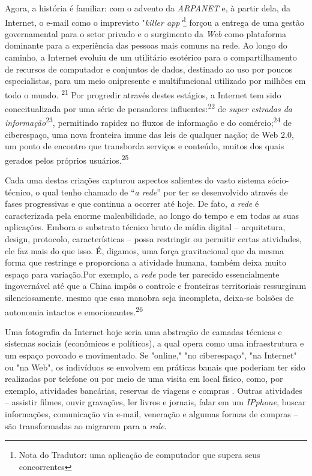 Agora, a história é familiar: com o advento da \emph{ARPANET} e, à
partir dela, da Internet, o e-mail como o imprevisto "\emph{killer
app"}\footnote{Nota do Tradutor: uma aplicação de computador que supera
  seus concorrentes} forçou a entrega de uma gestão governamental para o
setor privado e o surgimento da \emph{Web} como plataforma dominante
para a experiência das pessoas mais comuns na rede. Ao longo do caminho,
a Internet evoluiu de um utilitário esotérico para o compartilhamento de
recursos de computador e conjuntos de dados, destinado ao uso por poucos
especialistas, para um meio onipresente e multifuncional utilizado por
milhões em todo o mundo. \textsuperscript{{21}} Por progredir através
destes estágios, a Internet tem sido conceitualizada por uma série de
pensadores influentes:\textsuperscript{{22}} de \emph{super estradas da
informação}\textsuperscript{{23}}, permitindo rapidez no fluxos de
informação e do comércio;\textsuperscript{{24}} de ciberespaço, uma nova
fronteira imune das leis de qualquer nação; de Web 2.0, um ponto de
encontro que transborda serviços e conteúdo, muitos dos quais gerados
pelos próprios usuários.\textsuperscript{{25}}

Cada uma destas criações capturou aspectos salientes do vasto sistema
sócio-técnico, o qual tenho chamado de ``\emph{a rede}'' por ter se
desenvolvido através de fases progressivas e que continua a ocorrer até
hoje. De fato, \emph{a rede} é caracterizada pela enorme maleabilidade,
ao longo do tempo e em todas as suas aplicações. Embora o substrato
técnico bruto de mídia digital -- arquitetura, design, protocolo,
características -- possa restringir ou permitir certas atividades, ele
faz mais do que isso. É, digamos, uma força gravitacional que da mesma
forma que restringe e proporciona a atividade humana, também deixa muito
espaço para variação.Por exemplo, a \emph{rede} pode ter parecido
essencialmente ingovernável até que a China impôs o controle e
fronteiras territoriais ressurgiram silenciosamente. mesmo que essa
manobra seja incompleta, deixa-se bolsões de autonomia intactos e
emocionantes.\textsuperscript{{26}}

Uma fotografia da Internet hoje seria uma abstração de camadas técnicas
e sistemas sociais (econômicos e políticos), a qual opera como uma
infraestrutura e um espaço povoado e movimentado. Se "online," "no
ciberespaço", "na Internet" ou "na Web", os indivíduos se envolvem em
práticas banais que poderiam ter sido realizadas por telefone ou por
meio de uma visita em local físico, como, por exemplo, atividades
bancárias, reservas de viagens e compras . Outras atividades -- assistir
filmes, ouvir gravações, ler livros e jornais, falar em um
\emph{IPphone}, buscar informações, comunicação via e-mail, veneração e
algumas formas de compras -- são transformadas ao migrarem para a
\emph{rede}.

